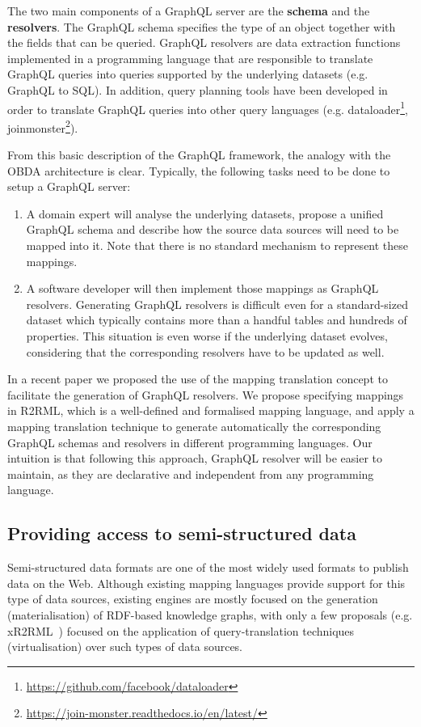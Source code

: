The two main components of a GraphQL server are the \textbf{schema} and the \textbf{resolvers}. The GraphQL schema specifies the type of an object together with the fields that can be queried. GraphQL resolvers are data extraction functions implemented in a programming language that are responsible to translate GraphQL queries into queries supported by the underlying datasets (e.g. GraphQL to SQL). In addition, query planning tools have been developed in order to translate GraphQL queries into other query languages (e.g. dataloader\footnote{\url{https://github.com/facebook/dataloader}}, joinmonster\footnote{\url{https://join-monster.readthedocs.io/en/latest/}}).

From this basic description of the GraphQL framework, the analogy with the OBDA architecture is clear. Typically, the following tasks need to be done to setup a GraphQL server: 
\begin{enumerate}
    \item A domain expert will analyse the underlying datasets, propose a unified GraphQL schema and describe how the source data sources will need to be mapped into it. Note that there is no standard mechanism to represent these mappings.
    \item A software developer will then implement those mappings as GraphQL resolvers.
    Generating GraphQL resolvers is difficult even for a standard-sized dataset which typically contains more than a handful tables and hundreds of properties. This situation is even worse if the underlying dataset evolves, considering that the corresponding resolvers have to be updated as well.
\end{enumerate}

In a recent paper \citep{priyatna2019morph} we proposed the use of the mapping translation concept to facilitate the generation of GraphQL resolvers. We propose specifying mappings in R2RML, which is a well-defined and formalised mapping language, and apply a mapping translation technique to generate automatically the corresponding GraphQL schemas and resolvers in different programming languages. Our intuition is that following this approach, GraphQL resolver will be easier to maintain, as they are declarative and independent from any programming language. 

\subsection{Providing access to semi-structured data}
Semi-structured data formats are one of the most widely used formats to publish data on the Web. Although existing mapping languages provide support for this type of data sources, existing engines are mostly focused on the generation (materialisation) of RDF-based knowledge graphs, with only a  few proposals (e.g. xR2RML~\citep{michel2015translation}) focused on the application of query-translation techniques (virtualisation) over such types of data sources.

